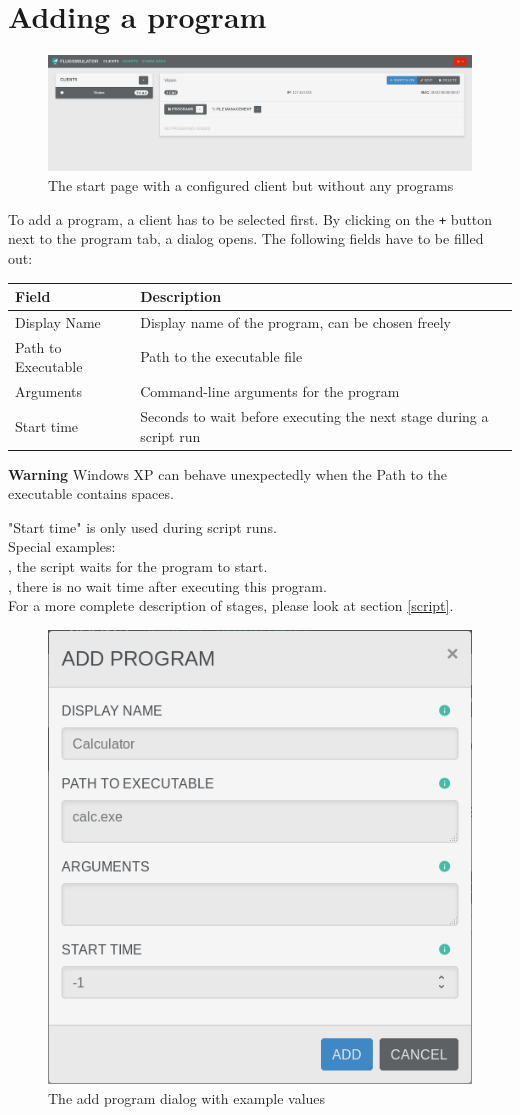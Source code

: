\documentclass[accentcolor=tud1a, paper=a4, colorback]{tudreport}
\begin{document}
	\section{Adding a program}
	\begin{figure}[h]
		\centering
		\includegraphics[width=.9\textwidth]{startpage_without_programs}
		\caption{The start page with a configured client but without any programs}
		\label{startpage_without_programs}
	\end{figure}
	To add a program, a client has to be selected first. By clicking on the \texttt{+}
	button next to the program tab, a dialog opens. The following fields have to be filled
	out:
	\begin{center}
	\begin{tabular}{l|l}
		Field & Description \\\hline
		Display Name &  Display name of the program, can be chosen freely\\
		Path to Executable & Path to the executable file\\
		Arguments & Command-line arguments for the program\\
		Start time & Seconds to wait before executing the next stage during a script run\\
	\end{tabular}
		\begin{tcolorbox}[width=\textwidth, colback=red!30, arc=0pt, boxrule=0pt]
		{\color{red}\textbf{Warning}}\hspace{0.5cm}
		Windows XP can behave unexpectedly when the Path to the executable contains spaces.
		\end{tcolorbox}
	\end{center}
	"Start time" is only used during script runs.\\
	Special examples:\\
	, the script waits for the program to start.\\
	, there is no wait time after executing this program.\\
	For a more complete description of stages, please look at section \ref{script}.

	\begin{figure}[h]
		\centering
		\includegraphics[width=.3\textwidth]{add_program}
		\caption{The add program dialog with example values}
		\label{add_program}
	\end{figure}
\end{document}
